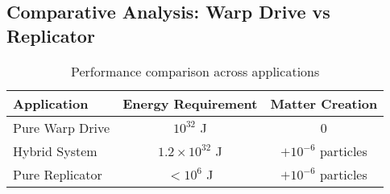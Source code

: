 \documentclass[11pt,a4paper]{article}
\begin{document}
\subsection{Comparative Analysis: Warp Drive vs Replicator}

\begin{table}[h]
\centering
\begin{tabular}{lcc}
\hline
Application & Energy Requirement & Matter Creation \\
\hline
Pure Warp Drive & $10^{32}$ J & 0 \\
Hybrid System & $1.2 \times 10^{32}$ J & $+10^{-6}$ particles \\
Pure Replicator & $< 10^{6}$ J & $+10^{-6}$ particles \\
\hline
\end{tabular}
\caption{Performance comparison across applications}
\end{table}
\end{document}
